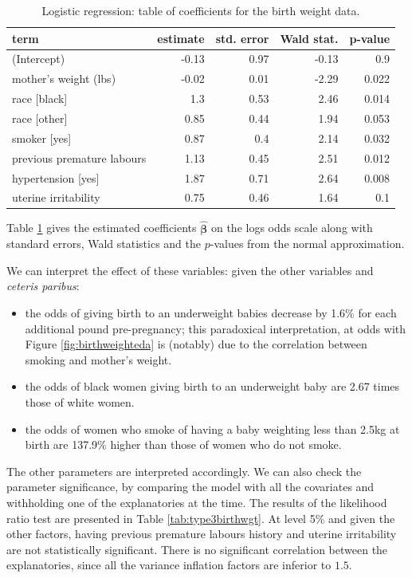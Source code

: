 \documentclass[
  11pt,
  letterpaper,
]{book}
\providecommand{\tightlist}{%
  \setlength{\itemsep}{0pt}\setlength{\parskip}{0pt}}
\theoremstyle{definition}
\theoremstyle{definition}
\theoremstyle{definition}
\theoremstyle{remark}
\begin{document}
\begin{table}

\caption{\label{tab:logistibirthwgt}Logistic regression: table of coefficients for the birth weight data.}
\centering
\begin{tabular}[t]{lrrrr}
\toprule
term & estimate & std. error & Wald stat. & p-value\\
\midrule
(Intercept) & -0.13 & 0.97 & -0.13 & 0.9\\
mother's weight (lbs) & -0.02 & 0.01 & -2.29 & 0.022\\
race [black] & 1.3 & 0.53 & 2.46 & 0.014\\
race [other] & 0.85 & 0.44 & 1.94 & 0.053\\
smoker [yes] & 0.87 & 0.4 & 2.14 & 0.032\\
\addlinespace
previous premature labours & 1.13 & 0.45 & 2.51 & 0.012\\
hypertension [yes] & 1.87 & 0.71 & 2.64 & 0.008\\
uterine irritability & 0.75 & 0.46 & 1.64 & 0.1\\
\bottomrule
\end{tabular}
\end{table}

Table \ref{tab:logistibirthwgt} gives the estimated coefficients \(\widehat{\boldsymbol{\beta}}\) on the logs odds scale along with standard errors, Wald statistics and the \(p\)-values from the normal approximation.

We can interpret the effect of these variables: given the other variables and \emph{ceteris paribus}:

\begin{itemize}
\tightlist
\item
  the odds of giving birth to an underweight babies decrease by 1.6\% for each additional pound pre-pregnancy; this paradoxical interpretation, at odds with Figure \ref{fig:birthweighteda} is (notably) due to the correlation between smoking and mother's weight.
\item
  the odds of black women giving birth to an underweight baby are 2.67 times those of white women.
\item
  the odds of women who smoke of having a baby weighting less than 2.5kg at birth are 137.9\% higher than those of women who do not smoke.
\end{itemize}

The other parameters are interpreted accordingly. We can also check the parameter significance, by comparing the model with all the covariates and withholding one of the explanatories at the time. The results of the likelihood ratio test are presented in Table \ref{tab:type3birthwgt}.
At level 5\% and given the other factors, having previous premature labours history and uterine irritability are not statistically significant. There is no significant correlation between the explanatories, since all the variance inflation factors are inferior to \(1.5\).
\end{document}
